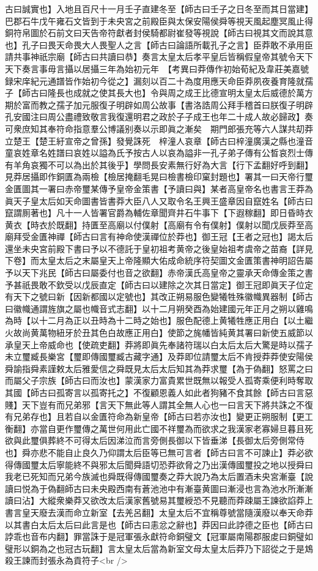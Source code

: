 古曰誠實也】入地且百尺十一月壬子直建冬至【師古曰壬子之日冬至而其日當建】巴郡石牛戊午雍石文皆到于未央宮之前殿臣與太保安陽侯舜等視天風起塵冥風止得銅符帛圖於石前文曰天告帝符獻者封侯騎都尉崔發等視說【師古曰視其文而說其意也】孔子曰畏天命畏大人畏聖人之言【師古曰論語所載孔子之言】臣莽敢不承用臣請共事神祇宗廟【師古曰共讀曰恭】奏言太皇太后孝平皇后皆稱假皇帝其號令天下天下奏言事毋言攝以居攝三年為始初元年　【考異曰莽傳作初始荀紀及韋莊美嘉號録宋庠紀元通譜皆作始初今從之】漏刻以百二十為度用應天命臣莽夙夜養育隆就孺子【師古曰隆長也成就之使其長大也】令與周之成王比德宣明太皇太后威德於萬方期於富而教之孺子加元服復子明辟如周公故事【書洛誥周公拜手稽首曰朕復子明辟孔安國注曰周公盡禮致敬言我復還明君之政於子子成王也年二十成人故必歸政】奏可衆庶知其奉符命指意羣公博議别奏以示即眞之漸矣　期門郎張充等六人謀共刧莽立楚王【楚王紆宣帝之曾孫】發覺誅死　梓潼人哀章【師古曰梓潼廣漢之縣也潼音童哀姓章名姓譜曰哀姓以謚為氏予按古人以哀為謚非一孔子弟子傳有公晳哀烈士傳有羊角哀獨不可以為出於其後乎】學問長安素無行好為大言【行下孟翻好呼到翻】見莽居攝即作銅匱為兩檢【檢居掩翻毛晃曰檢書檢印窠封題也】署其一曰天帝行璽金匱圖其一署曰赤帝璽某傳予皇帝金策書【予讀曰與】某者高皇帝名也書言王莽為眞天子皇太后如天命圖書皆書莽大臣八人又取令名王興王盛章因自竄姓名【師古曰竄謂厠著也】凡十一人皆署官爵為輔佐章聞齊井石牛事下【下遐稼翻】即日昏時衣黄衣【時衣於既翻】持匱至高廟以付僕射【高廟有令有僕射】僕射以聞戊辰莽至高廟拜受金匱神禪【師古曰言有神命使漢禪位於莽也】御王冠【王者之冠也】謁太后還坐未央宮前殿下書曰予以不德託于皇初祖考黄帝之後皇始祖考虞帝之苗裔【詳見下卷】而太皇太后之末屬皇天上帝隆顯大佑成命統序符契圖文金匱策書神明詔告屬予以天下兆民【師古曰屬委付也音之欲翻】赤帝漢氏高皇帝之靈承天命傳金策之書予甚祇畏敢不欽受以戊辰直定【師古曰以建除之次其日當定】御王冠即眞天子位定有天下之號曰新【因新都國以定號也】其改正朔易服色變犧牲殊徽幟異器制【師古曰徽幟通謂旌旗之屬也幟音式志翻】以十二月朔癸酉為始建國元年正月之朔以雞鳴為時【以十二月為正以丑時為十二時之始也】服色配德上黄犧牲應正用白【以土繼火故尚黄萬物紐牙於丑其色白故應正用白】使節之旄幡皆純黄其署曰新使五威節以承皇天上帝威命也【使疏吏翻】莽將即眞先奉諸符瑞以白太后太后大驚是時以孺子未立璽臧長樂宮【璽即傳國璽臧古藏字通】及莽即位請璽太后不肯授莽莽使安陽侯舜諭指舜素謹敕太后雅愛信之舜既見太后太后知其為莽求璽【為于偽翻】怒罵之曰而屬父子宗族【師古曰而汝也】蒙漢家力富貴累世既無以報受人孤寄乘便利時奪取其國【師古曰孤寄言以孤寄托之】不復顧恩義人如此者狗豬不食其餘【師古曰言惡賤】天下豈有而兄弟邪【言天下無此等人謂其全無人心也一曰言天下將共誅之不復有兄弟存也】且若自以金匱符命為新皇帝【師古曰若亦汝也】變更正朔服制【更工衡翻】亦當自更作璽傳之萬世何用此亡國不祥璽為而欲求之我漢家老寡婦旦暮且死欲與此璽俱葬終不可得太后因涕泣而言旁側長御以下皆垂涕【長御太后旁側常侍也】舜亦悲不能自止良久乃仰謂太后臣等已無可言者【師古曰言不可諫止】莽必欲得傳國璽太后寧能終不與邪太后聞舜語切恐莽欲脅之乃出漢傳國璽投之地以授舜曰我老已死知而兄弟今族滅也舜既得傳國璽奏之莽大說乃為太后置酒未央宮漸臺【說讀曰悦為于偽翻師古曰未央殿西南有蒼池池中有漸臺黄圖曰漸浸也言為池水所漸漸讀曰沾】大縱衆樂莽又欲改太后漢家舊號易其璽綬恐不見聽而莽疎屬王諫欲諂莽上書言皇天廢去漢而命立新室【去羌呂翻】太皇太后不宜稱尊號當隨漢廢以奉天命莽以其書白太后太后曰此言是也【師古曰恚忿之辭也】莽因曰此誖德之臣也【師古曰誖乖也音布内翻】罪當誅于是冠軍張永獻符命銅璧文【冠軍屬南陽郡服䖍曰銅璧如璧形以銅為之也冠古玩翻】言太皇太后當為新室文母太皇太后莽乃下詔從之于是鴆殺王諫而封張永為貢符子<br />
